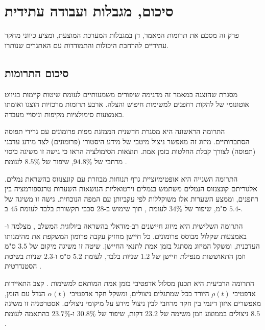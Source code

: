 

\section{סיכום, מגבלות ועבודה עתידית}
\label{sec:ch09_conclusion}

פרק זה מסכם את תרומות המאמר, דן במגבלות המערכת המוצעת, ומציע כיווני מחקר עתידיים להרחבת היכולות והתמודדות עם האתגרים שנותרו.

\subsection{סיכום התרומות}
\label{sec:ch09_contributions}

מסגרת  שהוצגה במאמר זה מדגימה שיפורים משמעותיים לעומת שיטות קיימות בניווט אוטונומי של להקות רחפנים למשימות חיפוש והצלה. ארבע תרומות מרכזיות הוצגו ואומתו באמצעות סימולציות מקיפות וניסויי מעבדה.

התרומה הראשונה היא מסגרת  חדשנית הממזגת מפות פרומונים עם גרידי תפוסה הסתברותיים. מיזוג זה מאפשר ניצול מיטבי של מידע היסטורי (פרומונים) לצד מידע עדכני (תפוסה) לצורך קבלת החלטות בזמן אמת. תוצאות הסימולציה הראו כי גישה זו משיגה כיסוי מרחבי של $94.8\%$, שיפור של $8.5\%$ לעומת  \cite{Lajoie2023SwarmSLAM}.

התרומה השנייה היא אופטימיזציית גרף תנוחות מבוזרת עם קונצנזוס בהשראת נמלים. אלגוריתם קונצנזוס הנמלים משתמש בנמלים וירטואליות הנושאות השערות טרנספורמציה בין רחפנים, וממצע השערות אלו משוקללות לפי עקביותן עם המפה הנוכחית. גישה זו משיגה  של $5.4$ ס"מ, שיפור של $34\%$ לעומת , תוך שימוש ב-$28$ סבבי תקשורת בלבד לעומת $45$ ב-.

התרומה השלישית היא מיזוג חיישנים רב-מודאלי בהשראה ביולוגית המשלב , מצלמה ו- באמצעות שקלול מבוסס פרומונים. כל חיישן מחזיק עקבה פרומון המשקפת את מהימנותו העדכנית, ומשקל המיזוג מסתגל בזמן אמת לתנאי החיישן. שיטה זו משיגה  מיקום של $3.5$ ס"מ וזמן התאוששות מנפילת חיישן של $1.2$ שניות בלבד, לעומת $5.2$ ס"מ ו-$2.3$ שניות בשיטת  הסטנדרטית \cite{Kalman1960}.

התרומה הרביעית היא תכנון מסלול אדפטיבי בזמן אמת המותאם למשימות . קצב התאיידות אדפטיבי $\rho(t)$ היורד ככל שמתגלים ניצולים, ומשקל חקר אדפטיבי $\alpha(t)$ הגדל עם הזמן, מאפשרים איזון דינמי בין חקר מרחבי לבין ניצול מידע על מיקומי ניצולים. אסטרטגיה זו משיגה $8.5$ ניצולים בממוצע וזמן משימה של $23.2$ דקות, שיפור של $30.8\%$ ו-$23.7\%$ בהתאמה לעומת .

